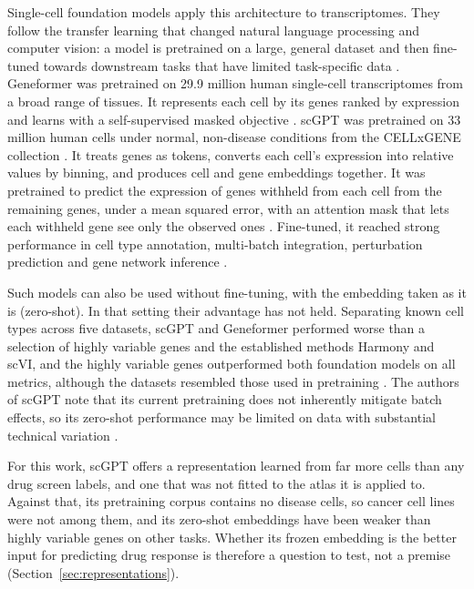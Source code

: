 Single-cell foundation models apply this architecture to transcriptomes. They follow the transfer
learning that changed natural language processing and computer vision: a model is pretrained on a large,
general dataset and then fine-tuned towards downstream tasks that have limited task-specific data
\cite{theodoris2023}. Geneformer was pretrained on 29.9 million human single-cell transcriptomes from a
broad range of tissues. It represents each cell by its genes ranked by expression and learns with a
self-supervised masked objective \cite{theodoris2023}. scGPT was pretrained on 33 million human cells
under normal, non-disease conditions from the CELLxGENE collection \cite{scgpt}. It treats genes as tokens,
converts each cell's expression into relative values by binning, and produces cell and gene embeddings
together. It was pretrained to predict the expression of genes withheld from each cell from the
remaining genes, under a mean squared error, with an attention mask that lets each withheld gene see
only the observed ones \cite{scgpt}.
Fine-tuned, it reached strong performance in cell type annotation, multi-batch integration,
perturbation prediction and gene network inference \cite{scgpt}.

Such models can also be used without fine-tuning, with the embedding taken as it is (zero-shot). In that
setting their advantage has not held. Separating known cell types across five datasets, scGPT and
Geneformer performed worse than a selection of highly variable genes and the established methods Harmony
and scVI, and the highly variable genes outperformed both foundation models on all metrics, although the
datasets resembled those used in pretraining \cite{kedzierska2025}. The authors of scGPT note that its
current pretraining does not inherently mitigate batch effects, so its zero-shot performance may be
limited on data with substantial technical variation \cite{scgpt}.

For this work, scGPT offers a representation learned from far more cells than any drug screen labels,
and one that was not fitted to the atlas it is applied to. Against that, its pretraining corpus contains
no disease cells, so cancer cell lines were not among them, and its zero-shot embeddings have been
weaker than highly variable genes on other tasks. Whether its frozen embedding is the better input for
predicting drug response is therefore a question to test, not a premise (Section~\ref{sec:representations}).

